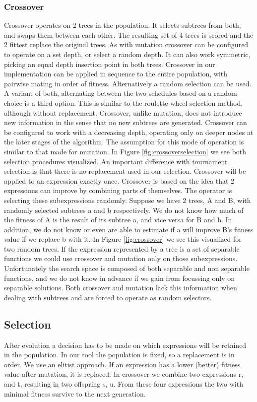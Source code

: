 \subsubsection{Crossover}
Crossover operates on 2 trees in the population. It selects subtrees from both, and swaps them between each other. The resulting set of 4 trees is scored and the 2 fittest replace the original trees. As with mutation crossover can be configured to operate on a set depth, or select a random depth. It can also work symmetric, picking an equal depth insertion point in both trees.
Crossover in our implementation can be applied in sequence to the entire population, with pairwise mating in order of fitness. Alternatively a random selection can be used. A variant of both, alternating between the two schedules based on a random choice is a third option. This is similar to the roulette wheel selection method, although without replacement. 
Crossover, unlike mutation, does not introduce new information in the sense that no new subtrees are generated. 
Crossover can be configured to work with a decreasing depth, operating only on deeper nodes at the later stages of the algorithm. The assumption for this mode of operation is similar to that made for mutation. 
In Figure \ref{fig:crossoverselection} we see both selection procedures visualized. An important difference with tournament selection is that there is no replacement used in our selection. Crossover will be applied to an expression exactly once.
Crossover is based on the idea that 2 expressions can improve by combining parts of themselves. The operator is selecting these subexpressions randomly. Suppose we have 2 trees, A and B, with randomly selected subtrees a and b respectively. We do not know how much of the fitness of A is the result of its subtree a, and vice versa for B and b. In addition, we do not know or even are able to estimate if a will improve B's fitness value if we replace b with it. In Figure \ref{fig:crossover} we see this visualized for two random trees.
If the expression represented by a tree is a set of separable functions we could use crossover and mutation only on those subexpressions. Unfortunately the search space is composed of both separable and non separable functions, and we do not know in advance if we gain from focussing only on separable solutions. Both crossover and mutation lack this information when dealing with subtrees and are forced to operate as random selectors.

\subsection{Selection}
After evolution a decision has to be made on which expressions will be retained in the population. In our tool the population is fixed, so a replacement is in order. We use an elitist approach. If an expression has a lower (better) fitness value after mutation, it is replaced. 
In crossover we combine two expressions r, and t, resulting in two offspring s, u. 
From these four expressions the two with minimal fitness survive to the next generation.

